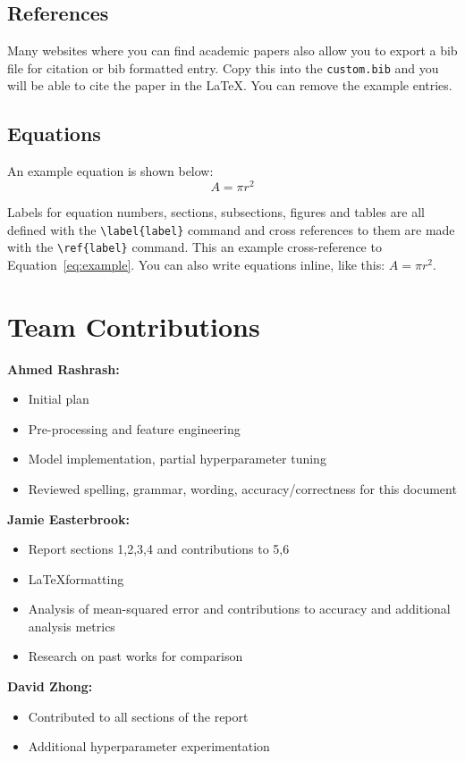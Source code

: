 \documentclass[11pt]{article}
\begin{document}
\subsection{References}

\nocite{Ando2005,andrew2007scalable,rasooli-tetrault-2015}

Many websites where you can find academic papers also allow you to export a bib file for citation or bib formatted entry. Copy this into the \texttt{custom.bib} and you will be able to cite the paper in the \LaTeX{}. You can remove the example entries.

\subsection{Equations}

An example equation is shown below:
\begin{equation}
  \label{eq:example}
  A = \pi r^2
\end{equation}

Labels for equation numbers, sections, subsections, figures and tables
are all defined with the \verb|\label{label}| command and cross references
to them are made with the \verb|\ref{label}| command.
This an example cross-reference to Equation~\ref{eq:example}. You can also write equations inline, like this: $A=\pi r^2$.
\fi


\section*{Team Contributions}

\textbf{Ahmed Rashrash:}
\begin{itemize}[nosep]
    \item Initial plan
    \item Pre-processing and feature engineering
    \item Model implementation, partial hyperparameter tuning
    \item Reviewed spelling, grammar, wording, accuracy/correctness for this document
\end{itemize}
\textbf{Jamie Easterbrook:}
\begin{itemize}[nosep]
    \item Report sections 1,2,3,4 and contributions to 5,6
    \item \LaTeX  formatting
    \item Analysis of mean-squared error and contributions to accuracy and additional analysis metrics
    \item Research on past works for comparison
\end{itemize}
\textbf{David Zhong:}
\begin{itemize}[nosep]
    \item Contributed to all sections of the report
    \item Additional hyperparameter experimentation
\end{itemize}
\end{document}
